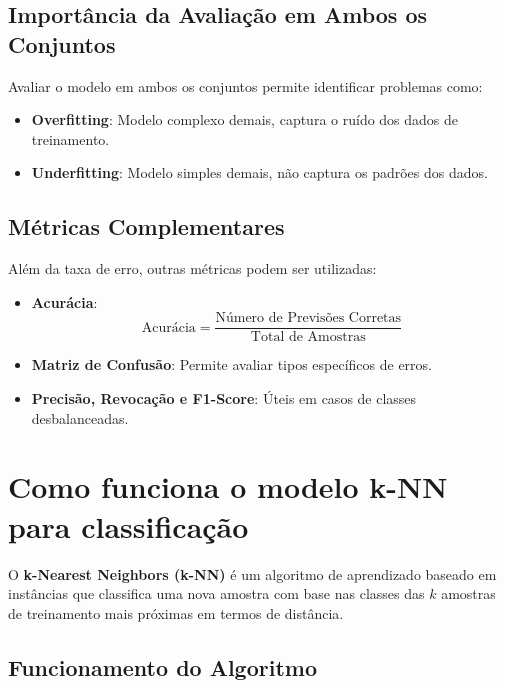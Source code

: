 \documentclass{sciposter}
\begin{document}
\begin{multicols}{3}
\subsection*{Importância da Avaliação em Ambos os Conjuntos}

Avaliar o modelo em ambos os conjuntos permite identificar problemas como:

\begin{itemize}
    \item \textbf{Overfitting}: Modelo complexo demais, captura o ruído dos dados de treinamento.
    \item \textbf{Underfitting}: Modelo simples demais, não captura os padrões dos dados.
\end{itemize}

\subsection*{Métricas Complementares}

Além da taxa de erro, outras métricas podem ser utilizadas:

\begin{itemize}
    \item \textbf{Acurácia}:
    \[
    \text{Acurácia} = \frac{\text{Número de Previsões Corretas}}{\text{Total de Amostras}}
    \]
    \item \textbf{Matriz de Confusão}: Permite avaliar tipos específicos de erros.
    \item \textbf{Precisão, Revocação e F1-Score}: Úteis em casos de classes desbalanceadas.
\end{itemize}

\section{Como funciona o modelo k-NN para classificação}

O \textbf{k-Nearest Neighbors (k-NN)} é um algoritmo de aprendizado baseado em instâncias que classifica uma nova amostra com base nas classes das $k$ amostras de treinamento mais próximas em termos de distância.

\subsection{Funcionamento do Algoritmo}


\end{multicols}
\end{document}
